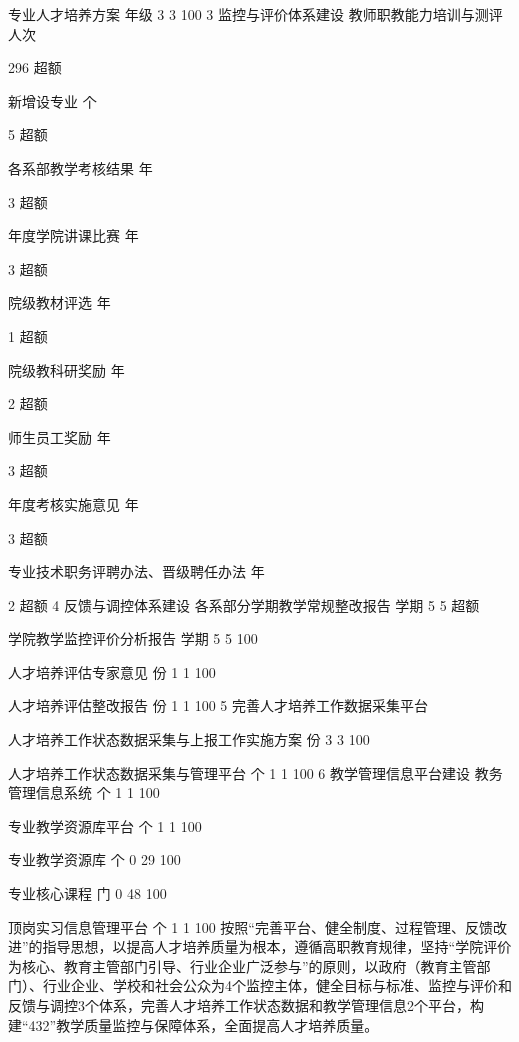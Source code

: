 专业人才培养方案
年级
3
3
100%
3
监控与评价体系建设
教师职教能力培训与测评
人次

296
超额


新增设专业
个

5
超额


各系部教学考核结果
年

3
超额


年度学院讲课比赛
年

3
超额


院级教材评选
年

1
超额


院级教科研奖励
年

2
超额


师生员工奖励
年

3
超额


年度考核实施意见
年

3
超额


专业技术职务评聘办法、晋级聘任办法
年

2
超额
4
反馈与调控体系建设
各系部分学期教学常规整改报告
学期
5
5
超额


学院教学监控评价分析报告
学期
5
5
100%


人才培养评估专家意见
份
1
1
100%


人才培养评估整改报告
份
1
1
100%
5
完善人才培养工作数据采集平台

人才培养工作状态数据采集与上报工作实施方案
份
3
3
100%


人才培养工作状态数据采集与管理平台
个
1
1
100%
6
教学管理信息平台建设
教务管理信息系统
个
1
1
100%


专业教学资源库平台
个
1
1
100%


专业教学资源库
个
0
29
100%


专业核心课程
门
0
48
100%


顶岗实习信息管理平台
个
1
1
100%
按照“完善平台、健全制度、过程管理、反馈改进”的指导思想，以提高人才培养质量为根本，遵循高职教育规律，坚持“学院评价为核心、教育主管部门引导、行业企业广泛参与”的原则，以政府（教育主管部门）、行业企业、学校和社会公众为4个监控主体，健全目标与标准、监控与评价和反馈与调控3个体系，完善人才培养工作状态数据和教学管理信息2个平台，构建“432”教学质量监控与保障体系，全面提高人才培养质量。










